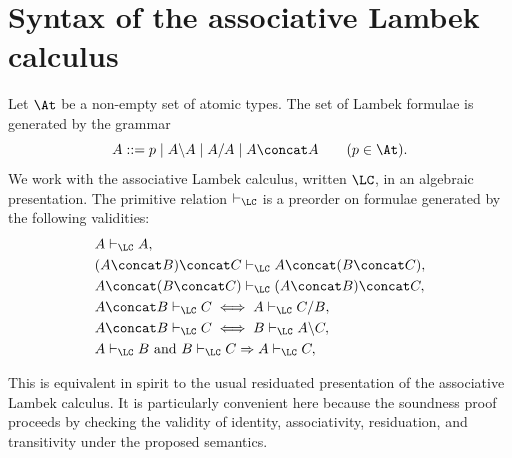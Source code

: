 \section{Syntax of the associative Lambek calculus}
Let $\At$ be a non-empty set of atomic types. The set of Lambek formulae is generated by the
grammar
\[
A ::= p \mid A \backslash A \mid A / A \mid A \concat A
\qquad (p \in \At).
\]
We work with the associative Lambek calculus, written $\LC$, in an algebraic presentation. The
primitive relation $\vdash_{\LC}$ is a preorder on formulae generated by the following validities:
\begin{align*}
& A \vdash_{\LC} A, \\
& (A \concat B) \concat C \vdash_{\LC} A \concat (B \concat C), \\
& A \concat (B \concat C) \vdash_{\LC} (A \concat B) \concat C, \\
& A \concat B \vdash_{\LC} C \iff A \vdash_{\LC} C/B, \\
& A \concat B \vdash_{\LC} C \iff B \vdash_{\LC} A\backslash C, \\
& A \vdash_{\LC} B \text{ and } B \vdash_{\LC} C \Rightarrow A \vdash_{\LC} C,
\end{align*}

This is equivalent in spirit to the usual residuated presentation of the associative Lambek
calculus. It is particularly convenient here because the soundness proof proceeds by checking the
validity of identity, associativity, residuation, and transitivity under the proposed semantics.

